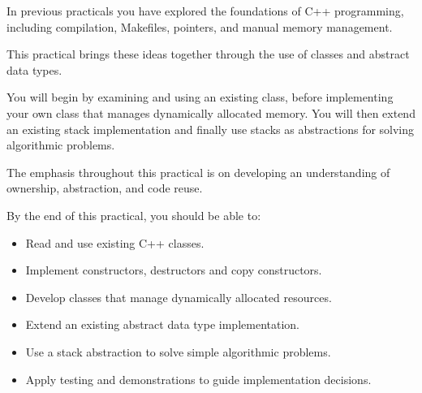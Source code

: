 \documentclass{csc2059practical}
\begin{document}
\maketitle

\tableofcontents
\clearpage



In previous practicals you have explored the foundations of C++ programming,
including compilation, Makefiles, pointers, and manual memory management.

This practical brings these ideas together through the use of classes and
abstract data types.

You will begin by examining and using an existing class, before implementing
your own class that manages dynamically allocated memory. You will then extend
an existing stack implementation and finally use stacks as abstractions for
solving algorithmic problems.

The emphasis throughout this practical is on developing an understanding of
ownership, abstraction, and code reuse.


\begin{learningoutcomes}

By the end of this practical, you should be able to:

\begin{itemize}

\item Read and use existing C++ classes.

\item Implement constructors, destructors and copy constructors.

\item Develop classes that manage dynamically allocated resources.

\item Extend an existing abstract data type implementation.

\item Use a stack abstraction to solve simple algorithmic problems.

\item Apply testing and demonstrations to guide implementation decisions.

\end{itemize}

\end{learningoutcomes}
\end{document}
